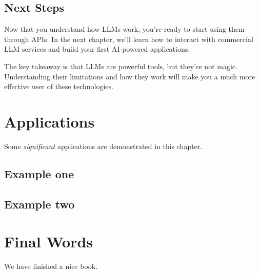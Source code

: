 \documentclass[
]{book}
\begin{document}
\section{Next Steps}\label{next-steps-1}

Now that you understand how LLMs work, you're ready to start using them through APIs. In the next chapter, we'll learn how to interact with commercial LLM services and build your first AI-powered applications.

The key takeaway is that LLMs are powerful tools, but they're not magic. Understanding their limitations and how they work will make you a much more effective user of these technologies.

\chapter{Applications}\label{applications}

Some \emph{significant} applications are demonstrated in this chapter.

\section{Example one}\label{example-one}

\section{Example two}\label{example-two}

\chapter{Final Words}\label{final-words}

We have finished a nice book.

  
\end{document}
